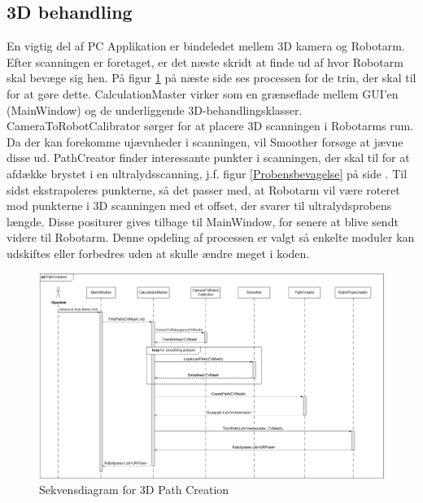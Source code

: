 \subsection{3D behandling}
En vigtig del af PC Applikation er bindeledet mellem 3D kamera og Robotarm. Efter scanningen er foretaget, er det næste skridt at finde ud af hvor Robotarm skal bevæge sig hen. På figur \ref{seq_pathcreation} på næste side ses processen for de trin, der skal til for at gøre dette. CalculationMaster virker som en grænseflade mellem GUI'en (MainWindow) og de underliggende 3D-behandlingsklasser. CameraToRobotCalibrator sørger for at placere 3D scanningen i Robotarms rum. Da der kan forekomme ujævnheder i scanningen, vil Smoother forsøge at jævne disse ud. PathCreator finder interessante punkter i scanningen, der skal til for at afdække brystet i en ultralydsscanning, j.f. figur \ref{Probensbevagelse} på side \pageref{Probensbevagelse}. Til sidst ekstrapoleres punkterne, så det passer med, at Robotarm vil være roteret mod punkterne i 3D scanningen med et offset, der svarer til ultralydsprobens længde. Disse positurer gives tilbage til MainWindow, for senere at blive sendt videre til Robotarm. Denne opdeling af processen er valgt så enkelte moduler kan udskiftes eller forbedres uden at skulle ændre meget i koden.
\begin{landscape}
\begin{figure}[H]
    \centering
    \includegraphics[height=0.94\textwidth]{figurer/d/Design/Sequence/sd_pathcreation}
    \caption{Sekvensdiagram for 3D Path Creation}
    \label{seq_pathcreation}
\end{figure}
\end{landscape}
\newpage

